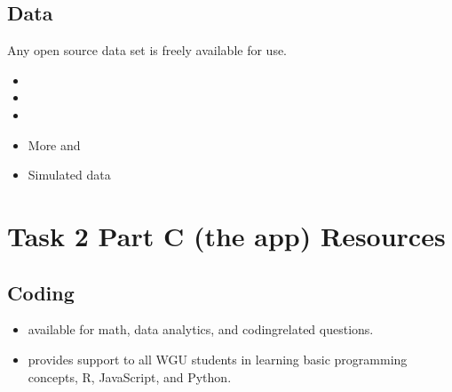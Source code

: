 \documentclass[letterpaper,10pt,english]{jupyterBook}
\begin{document}
\subsection{Data}
\label{\detokenize{resources:data}}\label{\detokenize{resources:resources-task1-data}}
\sphinxAtStartPar
Any open source data set is freely available for use.
\begin{itemize}
\item {} 
\sphinxAtStartPar
{}

\item {} 
\sphinxAtStartPar
{}

\item {} 
\sphinxAtStartPar
{}

\item {} 
\sphinxAtStartPar
More  and 

\item {} 
\sphinxAtStartPar
Simulated data

\end{itemize}


\section{Task 2 Part C (the app) Resources}
\label{\detokenize{resources:task-2-part-c-the-app-resources}}\label{\detokenize{resources:resources-task2examplec}}

\subsection{Coding}
\label{\detokenize{resources:coding}}\begin{itemize}
\item {} 
\sphinxAtStartPar
{\hyperref[\detokenize{ci_other:ci-other}]{}} available for math, data analytics, and coding\sphinxhyphen{}related questions.

\item {} 
\sphinxAtStartPar
{} provides support to all WGU students in learning basic programming concepts, R, JavaScript, and Python.

\end{itemize}
\end{document}
